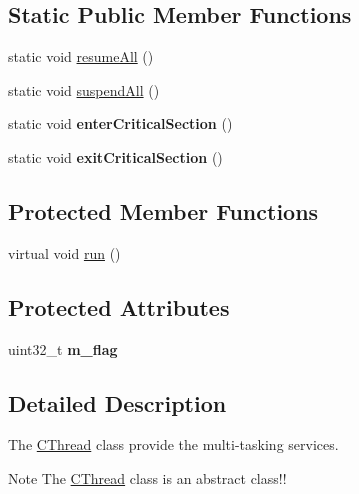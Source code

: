 \subsection*{Static Public Member Functions}
\begin{DoxyCompactItemize}
\item 
static void \hyperlink{class_c_thread_a743d4325b7e7da494283f3292773ff77}{resume\-All} ()
\item 
static void \hyperlink{class_c_thread_a2c09328581bd4e4a3e9e793f3376a92a}{suspend\-All} ()
\item 
\hypertarget{class_c_thread_aeb4cafe42d6cfc41294cf5dedcee8678}{static void {\bfseries enter\-Critical\-Section} ()}\label{class_c_thread_aeb4cafe42d6cfc41294cf5dedcee8678}

\item 
\hypertarget{class_c_thread_aab3a51062666552690be49b8e8027161}{static void {\bfseries exit\-Critical\-Section} ()}\label{class_c_thread_aab3a51062666552690be49b8e8027161}

\end{DoxyCompactItemize}
\subsection*{Protected Member Functions}
\begin{DoxyCompactItemize}
\item 
virtual void \hyperlink{class_c_thread_a071c3d3b3c19a7bd6a01aca073a9b4d7}{run} ()
\end{DoxyCompactItemize}
\subsection*{Protected Attributes}
\begin{DoxyCompactItemize}
\item 
\hypertarget{class_c_thread_a2723c18f3f7659cdd93610fd1654d564}{uint32\-\_\-t {\bfseries m\-\_\-flag}}\label{class_c_thread_a2723c18f3f7659cdd93610fd1654d564}

\end{DoxyCompactItemize}


\subsection{Detailed Description}
The \hyperlink{class_c_thread}{C\-Thread} class provide the multi-\/tasking services. 

\begin{DoxyNote}{Note}
The \hyperlink{class_c_thread}{C\-Thread} class is an abstract class!! 
\end{DoxyNote}


